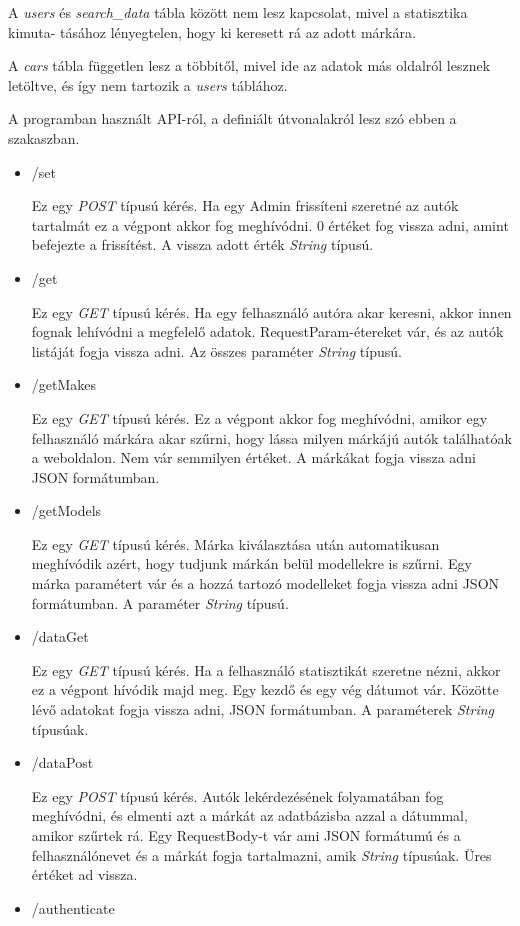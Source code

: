 A \textit{users} és \textit{search\_data} tábla között nem lesz kapcsolat, mivel a statisztika kimuta-
tásához lényegtelen, hogy ki keresett rá az adott márkára.

A \textit{cars} tábla független lesz a többitől, mivel ide az adatok más oldalról lesznek letöltve, és így nem tartozik a \textit{users} táblához.

 
A programban használt API-ról, a definiált útvonalakról lesz szó ebben a szakaszban.
\begin{itemize}
\item /set

Ez egy \textit{POST} típusú kérés. Ha egy Admin frissíteni szeretné az autók tartalmát ez a végpont akkor fog meghívódni.
0 értéket fog vissza adni, amint befejezte a frissítést. A vissza adott érték \textit{String} típusú.
\item /get

Ez egy \textit{GET} típusú kérés. Ha egy felhasználó autóra akar keresni, akkor innen fognak lehívódni a megfelelő adatok.
RequestParam-étereket vár, és az autók listáját fogja vissza adni. Az összes paraméter \textit{String} típusú.
\item /getMakes

Ez egy \textit{GET} típusú kérés. Ez a végpont akkor fog meghívódni, amikor egy felhasználó márkára akar szűrni, hogy lássa milyen márkájú autók találhatóak a weboldalon.
Nem vár semmilyen értéket. A márkákat fogja vissza adni JSON formátumban.
\item /getModels

Ez egy \textit{GET} típusú kérés. Márka kiválasztása után automatikusan meghívódik azért, hogy tudjunk márkán belül modellekre is szűrni.
Egy márka paramétert vár és a hozzá tartozó modelleket fogja vissza adni JSON  formátumban. A paraméter \textit{String} típusú.
\item /dataGet

Ez egy \textit{GET} típusú kérés. Ha a felhasználó statisztikát szeretne nézni, akkor ez a végpont hívódik majd meg.
Egy kezdő és egy vég dátumot vár. Közötte lévő adatokat fogja vissza adni, JSON formátumban. A paraméterek \textit{String} típusúak.
\item /dataPost

Ez egy \textit{POST} típusú kérés. Autók lekérdezésének folyamatában fog meghívódni, és elmenti azt a márkát az adatbázisba azzal a dátummal, amikor szűrtek rá.
Egy RequestBody-t vár ami JSON formátumú és a felhasználónevet és a márkát fogja tartalmazni, amik \textit{String} típusúak. Üres értéket ad vissza.
\item /authenticate


\end{itemize}
